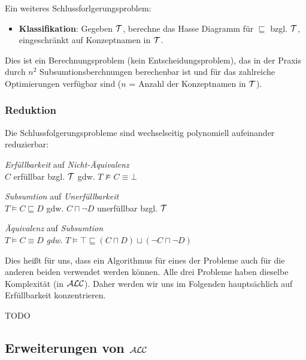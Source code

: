 Ein weiteres Schlussforlgerungsproblem:

\begin{itemize}
  \item \textbf{Klassifikation}: Gegeben $\mathcal{T}$, berechne das Hasse Diagramm für $\sqsubseteq$ bzgl. $\mathcal{T}$, eingeschränkt auf Konzeptnamen in $\mathcal{T}$.
\end{itemize}

Dies ist ein Berechnungsproblem (kein Entscheidungsproblem), das in der Praxis durch $n^2$ Subsumtionsberchnungen berechenbar ist und für das zahlreiche Optimierungen verfügbar sind ($n$ = Anzahl der Konzeptnamen in $\mathcal{T}$).

\subsubsection{Reduktion}

Die Schlussfolgerungsprobleme sind wechselseitig polynomiell aufeinander reduzierbar:

\begin{lemma}\mbox{}
\begin{enumerate}
\item{\emph{Erfüllbarkeit} auf \emph{Nicht-Äquivalenz} \\
$C$ erfüllbar bzgl. $\mathcal{T}$ gdw. $T \not\models C \equiv \bot$}
\item{\emph{Subsumtion} auf \emph{Unerfüllbarkeit} \\
$T \models C \sqsubseteq D$ gdw. $C \sqcap \neg D$ unerfüllbar bzgl.
$\mathcal{T}$
\item{\emph{Äquivalenz} auf \emph{Subsumtion} \\}
$T \models C \equiv D$ \emph{gdw.} $T \models \top \sqsubseteq \left( C \sqcap D \right) \sqcup \left( \neg C \sqcap \neg D \right)$}
\end{enumerate}
\end{lemma}

Dies heißt für uns, dass ein Algorithmus für eines der Probleme auch für die anderen beiden verwendet werden können. Alle drei Probleme haben dieselbe Komplexität (in $\mathcal{A}\mathcal{L}\mathcal{C}$). Daher werden wir uns im Folgenden hauptsächlich auf Erfüllbarkeit konzentrieren.

\begin{tafel}
    TODO
\end{tafel}

\subsection{Erweiterungen von \texorpdfstring{$\mathcal{A}\mathcal{L}\mathcal{C}$}{ALC}}\label{erweiterungen-von-alc}

